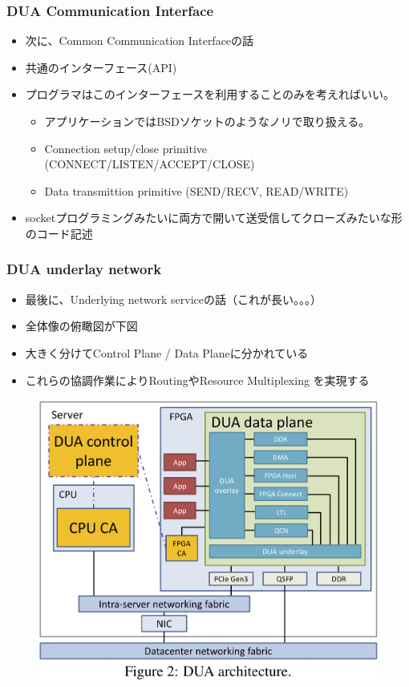 \documentclass[dvipdfmx,9pt,notheorems]{beamer}
\theoremstyle{definition}
\begin{document}
\begin{frame}\frametitle{DUA Communication Interface}
	\begin{itemize}
		\item 次に、{\color{red}Common Communication Interface}の話
		\item 共通のインターフェース(API)
		\item プログラマはこのインターフェースを利用することのみを考えればいい。
			\begin{itemize}
					\item アプリケーションではBSDソケットのようなノリで取り扱える。
					\item Connection setup/close primitive (CONNECT/LISTEN/ACCEPT/CLOSE)
					\item Data transmittion primitive (SEND/RECV, READ/WRITE)
			\end{itemize}
		\item socketプログラミングみたいに両方で開いて送受信してクローズみたいな形のコード記述
	\end{itemize}
\pnote{
}
\end{frame}

\begin{frame}\frametitle{DUA underlay network}
	\begin{itemize}
		\item 最後に、{\color{red}Underlying network service}の話（これが長い。。。）
		\item 全体像の俯瞰図が下図
		\item 大きく分けてControl Plane / Data Planeに分かれている
		\item これらの協調作業によりRoutingやResource Multiplexing を実現する
	\end{itemize}
  \begin{figure}[htb]
		\includegraphics[scale=0.6]{fig/figure2.png}
  \end{figure}
\pnote{
}
\end{frame}
\end{document}
